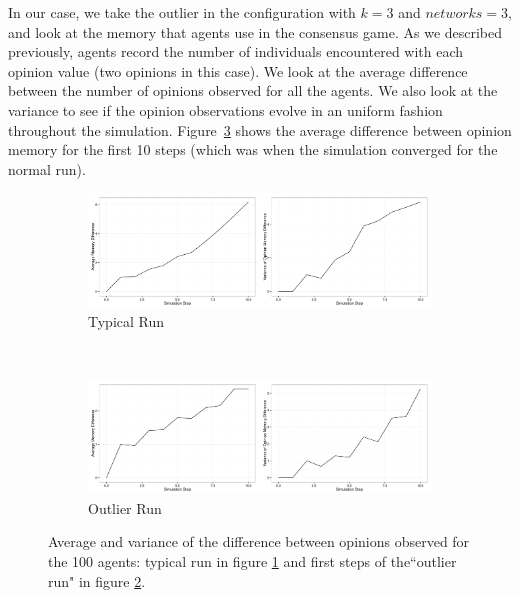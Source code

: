 \documentclass[preprint,number]{elsarticle}
\begin{document}
\noindent In our case, we take the outlier in the configuration with $k=3$ and $networks=3$, and look at the memory that agents use in the consensus game. As we described previously, agents record the number of individuals encountered with each opinion value (two opinions in this case). We look at the average difference between the number of opinions observed for all the agents. We also look at the variance to see if the opinion observations evolve in an uniform fashion throughout the simulation. Figure~\ref{fig:ctx_perm_kreg_runs_diff} shows the average difference between opinion memory for the first 10 steps (which was when the simulation converged for the normal run).

\begin{figure}[H]
	\centering
	\begin{subfigure}{1\linewidth}
		\centering
		\includegraphics[width=1\linewidth]{"../analysis/pdf/cp-regular-normal-run-memory-diff"}
		\caption{Typical Run}
		\label{fig:ctx_perm_kreg_run_normal_diff}
	\end{subfigure}%
	\\
	\begin{subfigure}{1\linewidth}
		\centering
		\includegraphics[width=1\linewidth]{"../analysis/pdf/cp-regular-outlier-run-memory-diff"}
		\caption{Outlier Run}
		\label{fig:ctx_perm_kreg_run_outlier_diff}
	\end{subfigure}
	
	\begin{minipage}{0.9\linewidth}
		\vspace{0.2cm}
		\caption{Average and variance of the difference between opinions observed for the 100 agents: typical run in figure \ref{fig:ctx_perm_kreg_run_normal_diff} and first steps of the``outlier run" in figure \ref{fig:ctx_perm_kreg_run_outlier_diff}.}
		\label{fig:ctx_perm_kreg_runs_diff}
	\end{minipage}
\end{figure}
\end{document}
